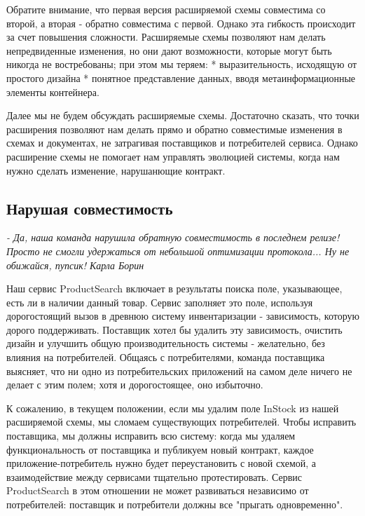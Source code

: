 \documentclass[11pt]{article}
\begin{document}
Обратите внимание, что первая версия расширяемой схемы совместима со
второй, а вторая - обратно совместима с первой. Однако эта гибкость
происходит за счет повышения сложности. Расширяемые схемы позволяют нам
делать непредвиденные изменения, но они дают возможности, которые могут
быть никогда не востребованы; при этом мы теряем: * выразительность,
исходящую от простого дизайна * понятное представление данных, вводя
метаинформационные элементы контейнера.

Далее мы не будем обсуждать расширяемые схемы. Достаточно сказать, что
точки расширения позволяют нам делать прямо и обратно совместимые
изменения в схемах и документах, не затрагивая поставщиков и
потребителей сервиса. Однако расширение схемы не помогает нам управлять
эволюцией системы, когда нам нужно сделать изменение, нарушанющие
контракт.

\subsection{Нарушая
совместимость}\label{ux43dux430ux440ux443ux448ux430ux44f-ux441ux43eux432ux43cux435ux441ux442ux438ux43cux43eux441ux442ux44c}

 \emph{- Да, наша команда нарушила обратную совместимость в последнем
релизе! Просто не смогли удержаться от небольшой оптимизации
протокола... Ну не обижайся, пупсик! Карла Борин}

Наш сервис ProductSearch включает в результаты поиска поле, указывающее,
есть ли в наличии данный товар. Сервис заполняет это поле, используя
дорогостоящий вызов в древнюю систему инвентаризации - зависимость,
которую дорого поддерживать. Поставщик хотел бы удалить эту зависимость,
очистить дизайн и улучшить общую производительность системы -
желательно, без влияния на потребителей. Общаясь с потребителями,
команда поставщика выясняет, что ни одно из потребительских приложений
на самом деле ничего не делает с этим полем; хотя и дорогостоящее, оно
избыточно.

К сожалению, в текущем положении, если мы удалим поле InStock из нашей
расширяемой схемы, мы сломаем существующих потребителей. Чтобы исправить
поставщика, мы должны исправить всю систему: когда мы удаляем
функциональность от поставщика и публикуем новый контракт, каждое
приложение-потребитель нужно будет переустановить с новой схемой, а
взаимодействие между сервисами тщательно протестировать. Сервис
ProductSearch в этом отношении не может развиваться независимо от
потребителей: поставщик и потребители должны все "прыгать одновременно".
\end{document}

